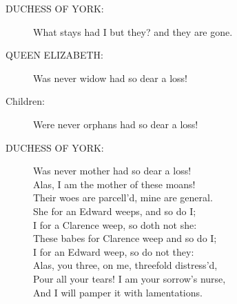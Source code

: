 \documentclass{article}
\begin{document}
\begin{description}
\item[DUCHESS OF YORK:] 
\hspace{1pt}What stays had I but they? and they are gone.\\
\end{description}
\begin{description}
\item[QUEEN ELIZABETH:] 
\hspace{1pt}Was never widow had so dear a loss!\\
\end{description}
\begin{description}
\item[Children:] 
\hspace{1pt}Were never orphans had so dear a loss!\\
\end{description}
\begin{description}
\item[DUCHESS OF YORK:] 
\hspace{1pt}Was never mother had so dear a loss!\\
\hspace{1pt}Alas, I am the mother of these moans!\\
\hspace{1pt}Their woes are parcell'd, mine are general.\\
\hspace{1pt}She for an Edward weeps, and so do I;\\
\hspace{1pt}I for a Clarence weep, so doth not she:\\
\hspace{1pt}These babes for Clarence weep and so do I;\\
\hspace{1pt}I for an Edward weep, so do not they:\\
\hspace{1pt}Alas, you three, on me, threefold distress'd,\\
\hspace{1pt}Pour all your tears! I am your sorrow's nurse,\\
\hspace{1pt}And I will pamper it with lamentations.\\
\end{description}
\end{document}
